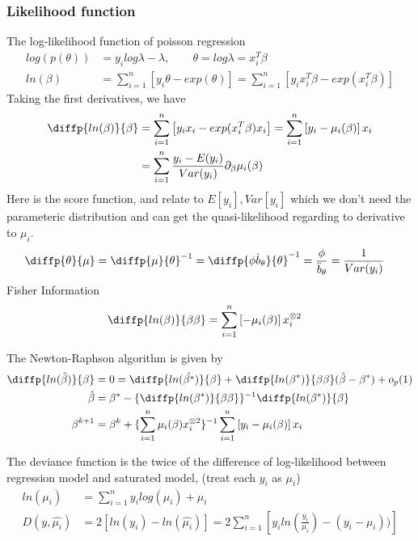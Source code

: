\documentclass[11pt]{article} %
\begin{document}
 \subsubsection{Likelihood function} 
The log-likelihood function of poisson regression
\begin{align*}
  log (p(\theta)) &= y_i log \lambda - \lambda , \qquad \theta = log \lambda = x_i^T \beta \\
   ln(\beta) &= \sum_{i=1}^n \left[ y_i \theta -  exp(\theta) \right] = \sum_{i=1}^n \left[ y_i x_i^T \beta -  exp(x_i^T \beta) \right] 
\end{align*}
Taking the first derivatives, we have
\begin{align*}
  \diffp {ln(\beta)}{\beta} &= \sum_{i=1}^n \left[ y_i x_i - exp(x_i^T\beta) x_i \right] = \sum_{i=1}^n \left[ y_i - \mu_i(\beta)  \right]x_i \\
&= \sum_{i=1}^n \frac{ y_i - E(y_i) }{Var(y_i)} \partial_{\beta} \mu_i(\beta)
\end{align*}
Here is the score function, and relate to $E[y_i], Var[y_i]$ which we don't need the parameteric distribution and can get the quasi-likelihood regarding to derivative to $\mu_i$.
\begin{align*}
  \diffp {\theta}{\mu} &=   \diffp {\mu}{\theta}^{-1} = \diffp {\phi \dot{b}_{\theta}}{\theta}^{-1} = \frac{\phi}{\ddot{b}_{\theta}} = \frac{1}{Var(y_i)}
\end{align*}
Fisher Information
\begin{align*}
  \diffp {ln(\beta)}{\beta \beta} &= \sum_{i=1}^n \left[ - \mu_i(\beta)  \right]x_i ^{\otimes 2}
\end{align*}

The Newton-Raphson algorithm is given by 
\begin{align*}
   \diffp {ln(\hat{\beta})}{\beta} &= 0 = \diffp {ln(\hat{\beta^{\ast}})}{\beta} +  \diffp {ln(\beta^{\ast})}{\beta \beta} (\hat{\beta} - \beta^{\ast}) + o_p(1)\\
   \hat{\beta} &=  \beta^{\ast} - \{ \diffp {ln(\beta^{\ast})}{\beta \beta} \}^{-1} \diffp {ln(\beta^{\ast})}{\beta} \\
   \beta^{k+1} &=\beta^{k} + \{ \sum_{i=1}^n \mu_i(\beta)  x_i ^{\otimes 2} \}^{-1}  \sum_{i=1}^n \left[ y_i - \mu_i(\beta)  \right]x_i
\end{align*}

The deviance function is the twice of the difference of log-likelihood between regression model and saturated model, (treat each $y_i$ as $\mu_i$)
\begin{align*}
   ln(\mu_i) &= \sum_{i=1}^n y_i log(\mu_i) + \mu_i\\
   D(y, \hat{\mu_i}) &= 2[ ln(y_i) - ln(\hat{\mu_i})] =  2 \sum_{i=1}^n[y_i ln(\frac{y_i}{\mu_i}) - (y_i-\mu_i) )] 
\end{align*}
\end{document}
